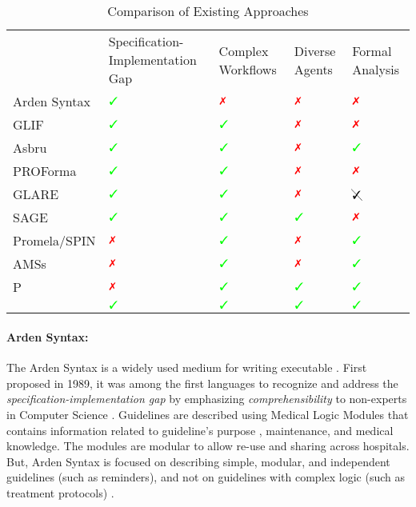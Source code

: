 \begin{table}[t]
  \scriptsize
  \begin{tabularx}{\textwidth}{
      >{\centering\arraybackslash}X
    || >{\centering\arraybackslash}X
    | >{\centering\arraybackslash}X
    | >{\centering\arraybackslash}X
    | >{\centering\arraybackslash}X
  }
                 & Specification-Implementation Gap  & Complex Workflows  & Diverse Agents   & Formal Analysis \\
    Arden Syntax & $\greencheck$                     & $\redcross$        & $\redcross$    & $\redcross$       \\
    GLIF         & $\greencheck$                     & $\greencheck$      & $\redcross$    & $\redcross$       \\
    Asbru        & $\greencheck$                     & $\greencheck$      & $\redcross$    & $\greencheck$     \\
    PROForma     & $\greencheck$                     & $\greencheck$      & $\redcross$    & $\redcross$       \\
    GLARE        & $\greencheck$                     & $\greencheck$      & $\redcross$    & $\cancelcheck$    \\
    SAGE         & $\greencheck$                     & $\greencheck$      & $\greencheck$  & $\redcross$       \\
    Promela/SPIN & $\redcross$                       & $\greencheck$      & $\redcross$    & $\greencheck$     \\
    AMSs         & $\redcross$                       & $\greencheck$      & $\redcross$    & $\greencheck$     \\
    P            & $\redcross$                       & $\greencheck$      & $\greencheck$  & $\greencheck$     \\
    \MediK{}     & $\greencheck$                     & $\greencheck$      & $\greencheck$  & $\greencheck$     \\
  \end{tabularx}
  \caption{Comparison of Existing Approaches}\label{table:existing-approaches}
  \end{table}


\paragraph{Arden Syntax:}

The Arden Syntax \cite{HripcsakCBM94} is a widely used medium for
writing executable \BPGs{}. First proposed in 1989, it was among the
first languages to recognize and address the \emph{specification-implementation
gap} by emphasizing \emph{comprehensibility} to non-experts in Computer Science \cite{SamwaldJBI12}.
Guidelines are described using Medical
Logic Modules that contains information related to guideline's purpose
, maintenance, and medical knowledge. The modules are modular to allow
re-use and sharing across hospitals. But, Arden Syntax
is focused on describing simple, modular, and independent
guidelines (such as reminders), and not on guidelines with complex logic (such
as treatment protocols) \cite{PelegJBI01}.

